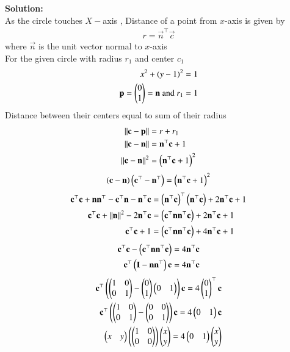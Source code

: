 \documentclass[journal]{IEEEtran}
\begin{document}
\textbf{Solution:}  \\
As the circle touches $X-$axis , Distance of a point from $x$-axis is given by
\begin{align}
    r=\vec{n}^\top\vec{c}
\end{align}
where $\vec{n}$ is the unit vector normal to $x$-axis\\
For the given circle with radius $r_1$ and center $c_1$
\begin{align}
 x^2+(y - 1)^2=1\\
 \mathbf{p}=\begin{pmatrix}0\\1\end{pmatrix}=\mathbf{n}\ \text{and}\ r_1=1 
\end{align}
Distance between their centers equal to sum of their radius
\begin{align}
    \left\lVert\mathbf{c}-\mathbf{p}\right\rVert&=r+r_1\\
\left\lVert\mathbf{c}-\mathbf{n}\right\rVert&=\mathbf{n}^\top\mathbf{c}+1 \\
\left\lVert\mathbf{c}-\mathbf{n}\right\rVert^2&=\left(\mathbf{n}^\top\mathbf{c}+1\right)^2 
\end{align}
\begin{align}
\left(\mathbf{c}-\mathbf{n}\right)\left(\mathbf{c}^\top-\mathbf{n}^\top\right)=\left(\mathbf{n}^\top\mathbf{c}+1\right)^2 
\end{align}
\begin{align}
\mathbf{c}^\top\mathbf{c}+\mathbf{n}\mathbf{n}^\top-\mathbf{c}^\top\mathbf{n}-\mathbf{n}^\top\mathbf{c}&=\left(\mathbf{n}^\top\mathbf{c}\right)^\top\left(\mathbf{n}^\top\mathbf{c}\right)+2\mathbf{n}^\top\mathbf{c}+1\\
\mathbf{c}^\top\mathbf{c}+\left\lVert\mathbf{n}\right\rVert^2-2\mathbf{n}^\top\mathbf{c}&=\left(\mathbf{c}^\top\mathbf{n}\mathbf{n}^\top\mathbf{c}\right)+2\mathbf{n}^\top\mathbf{c}+1 \\
\mathbf{c}^\top\mathbf{c}+1&=\left(\mathbf{c}^\top\mathbf{n}\mathbf{n}^\top\mathbf{c}\right)+4\mathbf{n}^\top\mathbf{c}+1 
\end{align}
\begin{align}
\mathbf{c}^\top\mathbf{c}-\left(\mathbf{c}^\top\mathbf{n}\mathbf{n}^\top\mathbf{c}\right)=4\mathbf{n}^\top\mathbf{c} \\
\mathbf{c}^\top\left(\mathbf{I}-\mathbf{n}\mathbf{n}^\top\right)\mathbf{c}=4\mathbf{n}^\top\mathbf{c} 
\end{align}
\begin{align}
\mathbf{c}^\top\left(\begin{pmatrix}1&0\\0&1\end{pmatrix}-\begin{pmatrix}0\\1\end{pmatrix}\begin{pmatrix}0&1\end{pmatrix}\right)\mathbf{c}=4\begin{pmatrix}0\\1\end{pmatrix}^\top\mathbf{c} \\
\mathbf{c}^\top\left(\begin{pmatrix}1&0\\0&1\end{pmatrix}-\begin{pmatrix}0&0\\0&1\end{pmatrix}\right)\mathbf{c}=4\begin{pmatrix}0&1\end{pmatrix}\mathbf{c} \\
\begin{pmatrix}x&y\end{pmatrix}\left(\begin{pmatrix}1&0\\0&0\end{pmatrix}\right)\begin{pmatrix}x\\y\end{pmatrix}=4\begin{pmatrix}0&1\end{pmatrix}\begin{pmatrix}x\\y\end{pmatrix} 
\end{align}
\end{document}
